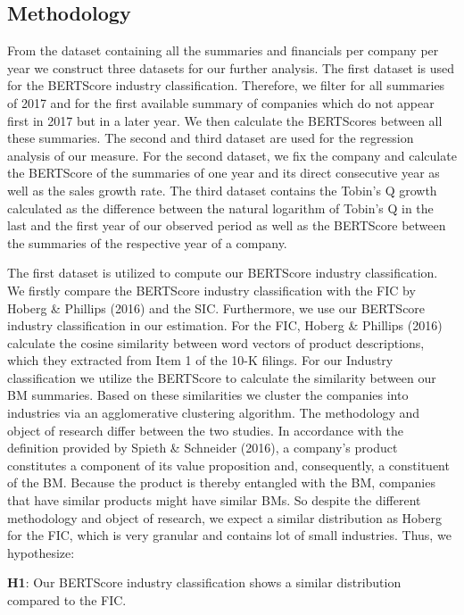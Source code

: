 \documentclass[
]{article}
\begin{document}
\subsection{Methodology}\label{methodology}

From the dataset containing all the summaries and financials per company
per year we construct three datasets for our further analysis. The first
dataset is used for the BERTScore industry classification. Therefore, we
filter for all summaries of 2017 and for the first available summary of
companies which do not appear first in 2017 but in a later year. We then
calculate the BERTScores between all these summaries. The second and
third dataset are used for the regression analysis of our measure. For
the second dataset, we fix the company and calculate the BERTScore of
the summaries of one year and its direct consecutive year as well as the
sales growth rate. The third dataset contains the Tobin's Q growth
calculated as the difference between the natural logarithm of Tobin's Q
in the last and the first year of our observed period as well as the
BERTScore between the summaries of the respective year of a company.

The first dataset is utilized to compute our BERTScore industry
classification. We firstly compare the BERTScore industry classification
with the FIC by Hoberg \& Phillips (2016) and the SIC. Furthermore, we
use our BERTScore industry classification in our estimation. For the
FIC, Hoberg \& Phillips (2016) calculate the cosine similarity between
word vectors of product descriptions, which they extracted from Item 1
of the 10-K filings. For our Industry classification we utilize the
BERTScore to calculate the similarity between our BM summaries. Based on
these similarities we cluster the companies into industries via an
agglomerative clustering algorithm. The methodology and object of
research differ between the two studies. In accordance with the
definition provided by Spieth \& Schneider (2016), a company's product
constitutes a component of its value proposition and, consequently, a
constituent of the BM. Because the product is thereby entangled with the
BM, companies that have similar products might have similar BMs. So
despite the different methodology and object of research, we expect a
similar distribution as Hoberg for the FIC, which is very granular and
contains lot of small industries. Thus, we hypothesize:

\textbf{H1}: Our BERTScore industry classification shows a similar
distribution compared to the FIC.
\end{document}
